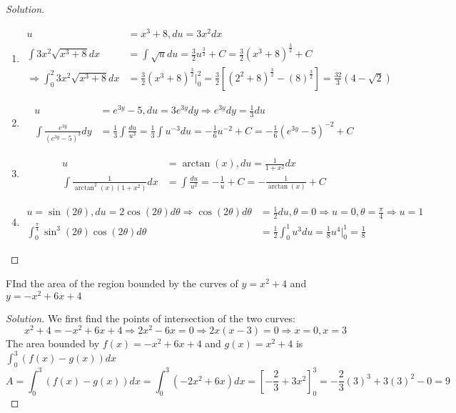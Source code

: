 \documentclass[crop=false,class=book]{standalone}
\begin{document}
\begin{proof}[Solution]
\
\begin{enumerate}
    \item   \begin{align*}
    u&=x^{3}+8, du=3x^{2}dx\\
    \int 3x^{2}\sqrt{x^{3}+8}dx&=\int\sqrt{u}du=\frac{3}{2}u^{\frac{3}{2}}+C=\frac{3}{2}(x^{3}+8)^{\frac{3}{2}}+C\\
    \Rightarrow\int_{0}^{2}3x^{2}\sqrt{x^{3}+8}dx&=\frac{3}{2}(x^{3}+8)^{\frac{3}{2}}\big|_{0}^{2}=\frac{3}{2}[(2^{2}+8)^{\frac{3}{2}}-(8)^{\frac{3}{2}}]=\frac{32}{3}(4-\sqrt{2})
            \end{align*}
    \item   \begin{align*}
    u&=e^{3y}-5,du=3e^{3y}dy\Rightarrow e^{3y}dy=\frac{1}{3}du\\
    \int\frac{e^{3y}}{(e^{3y}-5)^{3}}dy&=\frac{1}{3}\int\frac{du}{u^{3}}=\frac{1}{3}\int u^{-3}du=-\frac{1}{6}u^{-2}+C=-\frac{1}{6}(e^{3y}-5)^{-2}+C
            \end{align*}
    \item   \begin{align*}
    u&=\arctan(x),du=\frac{1}{1+x^{2}}dx\\
    \int\frac{1}{\arctan^{2}(x)(1+x^{2})}dx&=\int\frac{du}{u^{2}}=-\frac{1}{u}+C=-\frac{1}{\arctan(x)}+C
            \end{align*}
    \item   \begin{align*}
    u=\sin(2\theta),du=2\cos(2\theta)d\theta\Rightarrow\cos(2\theta)d\theta&=\frac{1}{2}du,\theta=0\Rightarrow u=0,\theta=\frac{\pi}{4}\Rightarrow u=1\\
    \int_{0}^{\frac{\pi}{4}}\sin^{3}(2\theta)\cos(2\theta)d\theta&=\frac{1}{2}\int_{0}^{1}u^{3}du=\frac{1}{8}u^{4}\big|_{0}^{1}=\frac{1}{8}
            \end{align*}
\end{enumerate}
\end{proof}
\begin{problem}
FInd the area of the region bounded by the curves of $y=x^{2}+4$ and $y=-x^{2}+6x+4$
\end{problem}
\begin{proof}[Solution]
We first find the points of intersection of the two curves:
\begin{equation*}
    x^{2}+4=-x^{2}+6x+4\Rightarrow2x^{2}-6x=0\Rightarrow 2x(x-3)=0\Rightarrow x=0,x=3
\end{equation*}
The area bounded by $f(x)=-x^{2}+6x+4$ and $g(x)=x^{2}+4$ is $\int_{0}^{3}(f(x)-g(x))dx$
\begin{equation*}
    A=\int_{0}^{3}(f(x)-g(x))dx=\int_{0}^{3}(-2x^{2}+6x)dx=[-\frac{2}{3}+3x^{2}]_{0}^{3}=-\frac{2}{3}(3)^{3}+3(3)^{2}-0=9
\end{equation*}
\end{proof}
\end{document}
